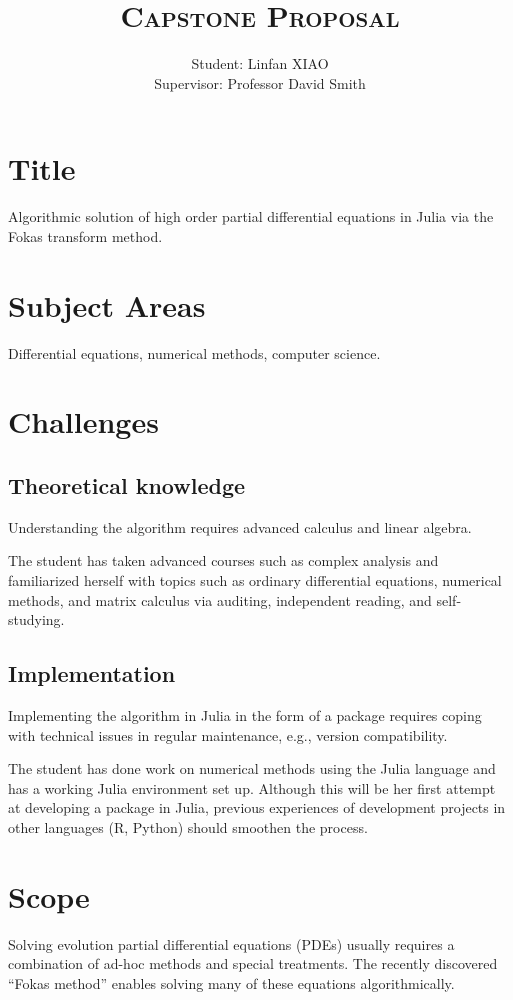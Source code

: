 \documentclass[11pt, oneside, a4paper]{article}
\author{
    Student: Linfan XIAO\\
    Supervisor: Professor David Smith
    }
\title{\textsc{Capstone Proposal}}
\date{\vspace{-5ex}}
\begin{document}
\maketitle

\thispagestyle{fancy}


\section{Title}
Algorithmic solution of high order partial differential equations in Julia via the Fokas transform method.

\section{Subject Areas}
Differential equations, numerical methods, computer science.

\section{Challenges}
\subsection{Theoretical knowledge}
Understanding the algorithm requires advanced calculus and linear algebra. 

The student has taken advanced courses such as complex analysis and familiarized herself with topics such as ordinary differential equations, numerical methods, and matrix calculus via auditing, independent reading, and self-studying.

\subsection{Implementation}
Implementing the algorithm in Julia in the form of a package requires coping with technical issues in regular maintenance, e.g., version compatibility. 

The student has done work on numerical methods using the Julia language and has a working Julia environment set up. Although this will be her first attempt at developing a package in Julia, previous experiences of development projects in other languages (R, Python) should smoothen the process.

\section{Scope}
Solving evolution partial differential equations (PDEs) usually requires a combination of ad-hoc methods and special treatments. The recently discovered ``Fokas method'' enables solving many of these equations algorithmically. 
\end{document}
